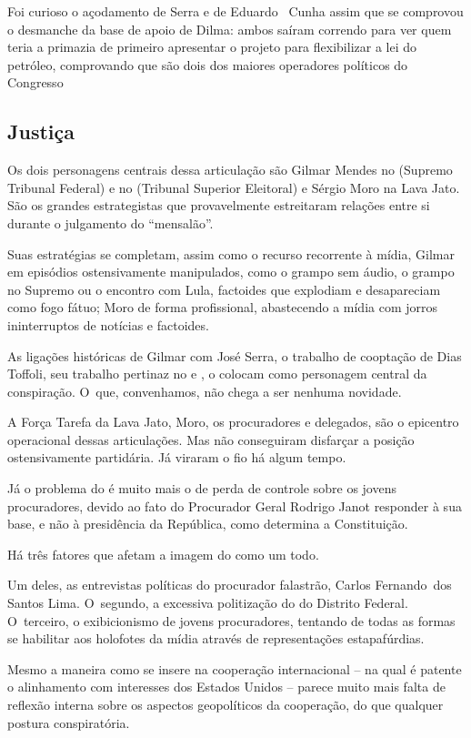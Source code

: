 Foi curioso o açodamento de Serra e de Eduardo ~Cunha assim que se
comprovou o desmanche da base de apoio de Dilma: ambos saíram correndo
para ver quem teria a primazia de primeiro apresentar o projeto para
flexibilizar a lei do petróleo, comprovando que são dois dos maiores
operadores políticos do Congresso

\subsection{Justiça}

Os dois personagens centrais dessa articulação são Gilmar Mendes no 
(Supremo Tribunal Federal) e no  (Tribunal Superior Eleitoral) e
Sérgio Moro na Lava Jato. São os grandes estrategistas que provavelmente
estreitaram relações entre si durante o julgamento do ``mensalão''.

Suas estratégias se completam, assim como o recurso recorrente à mídia,
Gilmar em episódios ostensivamente manipulados, como o grampo sem áudio,
o grampo no Supremo ou o encontro com Lula, factoides que explodiam e
desapareciam como fogo fátuo; Moro de forma profissional, abastecendo a
mídia com jorros ininterruptos de notícias e factoides.

As ligações históricas de Gilmar com José Serra, o trabalho de cooptação
de Dias Toffoli, seu trabalho pertinaz no  e , o colocam como
personagem central da conspiração. O~que, convenhamos, não chega a ser
nenhuma novidade.

A Força Tarefa da Lava Jato, Moro, os procuradores e delegados, são o
epicentro operacional dessas articulações. Mas não conseguiram disfarçar
a posição ostensivamente partidária. Já viraram o fio há algum tempo.

Já o problema do  é muito mais o de perda de controle sobre os jovens
procuradores, devido ao fato do Procurador Geral Rodrigo Janot responder
à sua base, e não à presidência da República, como determina a
Constituição.

Há três fatores que afetam a imagem do  como um todo.

Um deles, as entrevistas políticas do procurador falastrão, Carlos
Fernando~dos Santos Lima. O~segundo, a excessiva politização do  do
Distrito Federal. O~terceiro, o exibicionismo de jovens procuradores,
tentando de todas as formas se habilitar aos holofotes da mídia através
de representações estapafúrdias.

Mesmo a maneira como se insere na cooperação internacional -- na qual é
patente o alinhamento com interesses dos Estados Unidos -- parece muito
mais falta de reflexão interna sobre os aspectos geopolíticos da
cooperação, do que qualquer postura conspiratória.

